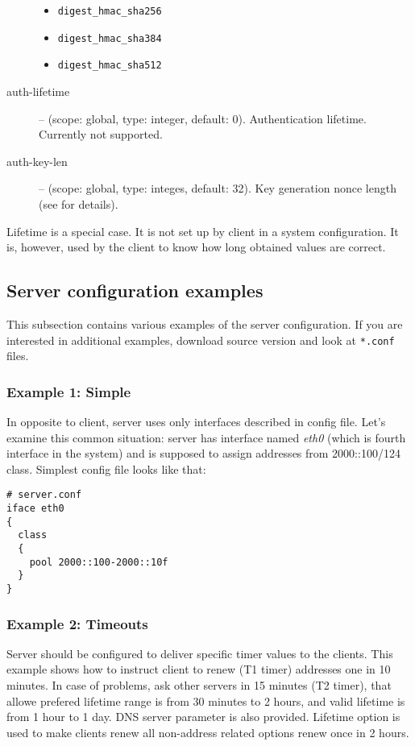 \begin{description}
\begin{itemize}
             \item \texttt{digest\_hmac\_sha256}
             \item \texttt{digest\_hmac\_sha384}
             \item \texttt{digest\_hmac\_sha512}
            \end{itemize}
 \item[auth-lifetime] -- (scope: global, type: integer, default: 0). Authentication
            lifetime. Currently not supported.
 \item[auth-key-len] -- (scope: global, type: integes, default: 32). Key generation nonce
            length (see \cite{draft-aaa} for details).

\end{description}

Lifetime is a special case. It is not set up by client in a system
configuration. It is, however, used by the client to know how long
obtained values are correct.

\subsection{Server configuration examples}

This subsection contains various examples of the server
configuration. If you are interested in additional examples, download source version
and look at \verb+*.conf+ files.

\subsubsection{Example 1: Simple}

In opposite to client, server uses only interfaces described in config
file. Let's examine this common situation: server has interface
named \emph{eth0} (which is fourth interface in the system) and is
supposed to assign addresses from 2000::100/124 class. Simplest config
file looks like that:

\begin{lstlisting}
# server.conf
iface eth0
{ 
  class
  {
    pool 2000::100-2000::10f
  } 
}
\end{lstlisting}

\subsubsection{Example 2: Timeouts}
Server should be configured to deliver specific timer values to the
clients. This example shows how to instruct client to renew (T1 timer) 
addresses one in 10 minutes. In case of problems, ask other servers in
15 minutes (T2 timer), that allowe prefered lifetime range is from 30
minutes to 2 hours, and valid lifetime is from 1 hour to 1 day. DNS
server parameter is also provided. Lifetime option is used to make
clients renew all non-address related options renew once in 2 hours.


